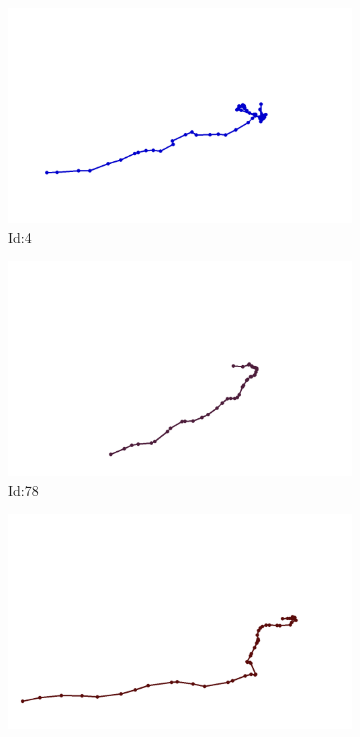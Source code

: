 \documentclass[12pt,twoside]{report}
\begin{document}
\begin{figure}
\centering
\begin{subfigure}[b]{0.20\textwidth}
\centering
\includegraphics[width=\textwidth]{../../trajectories/4.png}
\caption{Id:4}
\end{subfigure}
\begin{subfigure}[b]{0.20\textwidth}
\centering
\includegraphics[width=\textwidth]{../../trajectories/78.png}
\caption{Id:78}
\end{subfigure}
\begin{subfigure}[b]{0.20\textwidth}
\centering
\includegraphics[width=\textwidth]{../../trajectories/96.png}

\end{subfigure}
\end{figure}
\end{document}
